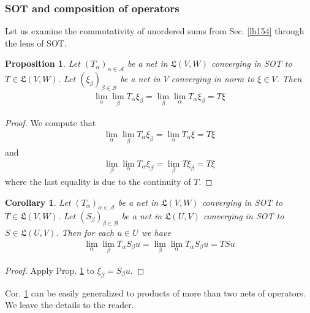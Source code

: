 \documentclass[12pt,b5paper,notitlepage]{article}
\theoremstyle{definition}
\theoremstyle{plain}
\newtheorem{pp}[df]{Proposition}
\newtheorem{co}[df]{Corollary}
\newcommand{\fk}{\mathfrak}
\newcommand{\scr}{\mathscr}
\numberwithin{equation}{section}
\begin{document}
\subsubsection{SOT and composition of operators}


Let us examine the commutativity of unordered sums from Sec. \ref{lb154} through the lens of SOT.


\begin{pp}\label{lb156}
Let $(T_\alpha)_{\alpha\in\scr A}$ be a net in $\fk L(V,W)$ converging in SOT to $T\in\fk L(V,W)$. Let $(\xi_\beta)_{\beta\in\scr B}$ be a net in $V$ converging in norm to $\xi\in V$. Then 
\begin{align}
\lim_\alpha \lim_\beta T_\alpha \xi_\beta=\lim_\beta\lim_\alpha T_\alpha \xi_\beta=T\xi
\end{align}
\end{pp}

\begin{proof}
We compute that
\begin{align*}
\lim_\alpha\lim_\beta T_\alpha \xi_\beta=\lim_\alpha T_\alpha \xi=T\xi
\end{align*}
and
\begin{align*}
\lim_\beta\lim_\alpha T_\alpha \xi_\beta=\lim_\beta T\xi_\beta=T\xi
\end{align*}
where the last equality is due to the continuity of $T$.
\end{proof}


\begin{co}\label{lb158}
Let $(T_\alpha)_{\alpha\in\scr A}$ be a net in $\fk L(V,W)$ converging in SOT to $T\in\fk L(V,W)$. Let $(S_\beta)_{\beta\in\scr B}$ be a net in $\fk L(U,V)$ converging in SOT to $S\in\fk L(U,V)$. Then for each $u\in U$ we have
\begin{align}
\lim_\alpha \lim_\beta T_\alpha S_\beta u=\lim_\beta\lim_\alpha T_\alpha S_\beta u=TSu
\end{align}
\end{co}

\begin{proof}
Apply Prop. \ref{lb156} to $\xi_\beta= S_\beta u$.
\end{proof}

Cor. \ref{lb158} can be easily generalized to products of more than two nets of operators. We leave the details to the reader.
\end{document}
